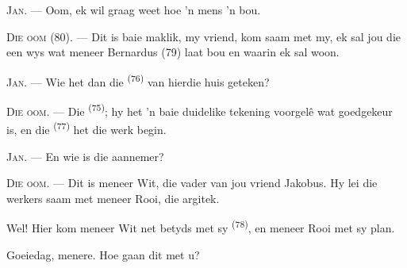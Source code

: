 %
%
%
%

\VUsaut{6.0mm}
\VUsaut{1.4mm}
\VUsaut{2.2mm}

\VUsaut{3.0mm}

\textsc{Jan}. --- Oom, ek wil graag weet hoe 'n mens 'n  bou.

\textsc{Die oom} (80). --- Dit is baie maklik, my vriend, kom saam met my, ek sal jou
die een wys wat meneer Bernardus (79) laat bou en waarin ek sal woon.

\textsc{Jan}. --- Wie het dan die  \textsuperscript{(76)} van hierdie huis
geteken?

\textsc{Die oom}. --- Die  \textsuperscript{(75)}; hy het 'n baie
duidelike tekening voorgelê wat goedgekeur is, en die 
\textsuperscript{(77)} het die werk begin.

\textsc{Jan}. --- En wie is die aannemer?

\textsc{Die oom}. --- Dit is meneer Wit, die vader van jou vriend Jakobus. Hy lei die
werkers saam met meneer Rooi, die argitek.

Wel! Hier kom meneer Wit net betyds met sy  \textsuperscript{(78)}, en
meneer Rooi met sy plan.

Goeiedag, menere. Hoe gaan dit met u?

